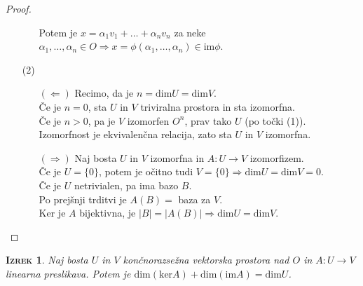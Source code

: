 \documentclass[a4paper,12pt]{article}
\newtheorem*{izrek}{\textsc{Izrek}}
\begin{document}
\begin{proof}
\begin{enumerate}
\begin{itemize}
Potem je $x=\alpha_1v_1+\ldots+\alpha_nv_n$ za neke $\alpha_1,\ldots,\alpha_n\in O \Rightarrow x=\phi(\alpha_1,\ldots,\alpha_n)\in \text{im}\phi$.\\
\end{itemize}
\newpage
\item[(2)]
\begin{itemize}
\item[$(\Leftarrow)$]
Recimo, da je $n=\text{dim}U=\text{dim}V$.\\

Če je $n=0$, sta $U$ in $V$ triviralna prostora in sta izomorfna. \\

Če je $n>0$, pa je $V$ izomorfen $O^n$, prav tako $U$ (po točki (1)).\\

Izomorfnost je ekvivalenčna relacija, zato sta $U$ in $V$ izomorfna.\\

\item[$(\Rightarrow)$]
Naj bosta $U$ in $V$ izomorfna in $A:U\to V$ izomorfizem. \\

Če je $U=\{0\}$, potem je očitno tudi $V=\{0\}\Rightarrow \text{dim}U=\text{dim}V=0$. \\

Če je $U$ netrivialen, pa ima bazo $B$.\\

Po prejšnji trditvi je $A(B)=$ baza za $V$.\\

Ker je $A$ bijektivna, je $|B|=|A(B)|\Rightarrow \text{dim}U=\text{dim}V$.
\end{itemize}
\end{enumerate}
\end{proof}

\begin{izrek}
Naj bosta $U$ in $V$ končnorazsežna vektorska prostora nad $O$ in $A:U\to V$ linearna preslikava. Potem je $\text{dim}(\text{ker}A)+\text{dim}(\text{im}A)=\text{dim}U$.\\
\end{izrek}
\end{document}
